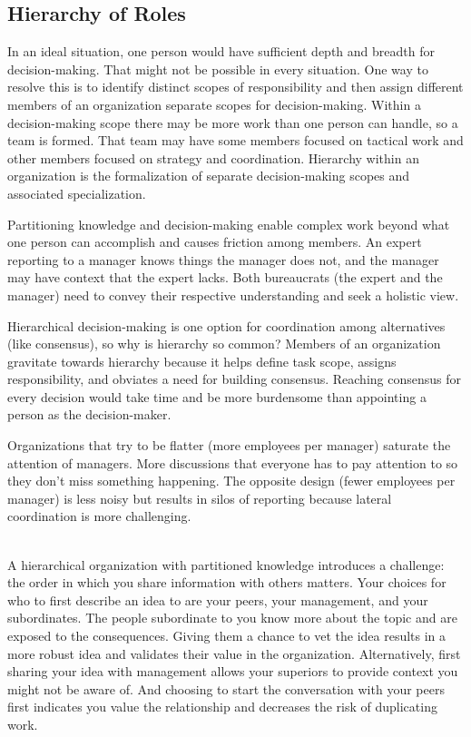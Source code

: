 \subsection*{Hierarchy of Roles\label{sec:hierarchy-of-roles}}


In an ideal situation, one person would have sufficient depth and breadth for decision-making. That might not be possible in every situation. One way to resolve this is to identify distinct scopes of responsibility and then assign different members of an organization separate scopes for decision-making. Within a decision-making scope there may be more work than one person can handle, so a team is formed. That team may have some members focused on tactical work and other members focused on strategy and coordination. Hierarchy within an organization is the formalization of separate decision-making scopes and associated specialization. 

Partitioning knowledge and decision-making enable complex work beyond what one person can accomplish and causes friction among members. An expert reporting to a manager knows things the manager does not, and the manager may have context that the expert lacks. Both bureaucrats (the expert and the manager) need to convey their respective understanding and seek a holistic view.

Hierarchical decision-making is one option for coordination among alternatives (like consensus), so why is hierarchy so common? Members of an organization gravitate towards hierarchy because it helps define task scope, assigns responsibility, and obviates a need for building consensus. Reaching consensus for every decision would take time and be more burdensome than appointing a person as the decision-maker.

Organizations that try to be flatter (more employees per manager) saturate the attention of managers. More discussions that everyone has to pay attention to so they don't miss something happening. The opposite design (fewer employees per manager) is less noisy but results in silos of reporting because lateral coordination is more challenging.

\ \\

A hierarchical organization with partitioned knowledge introduces a challenge: the order in which you share information with others matters. Your choices for who to first describe an idea to are your peers, your management, and your subordinates. 
The people subordinate to you know more about the topic and are exposed to the consequences. Giving them a chance to vet the idea results in a more robust idea and validates their value in the organization. Alternatively, first sharing your idea with management  allows your superiors to provide context you might not be aware of. And choosing to  start the conversation with your peers first indicates you value the relationship and decreases the risk of duplicating work.

